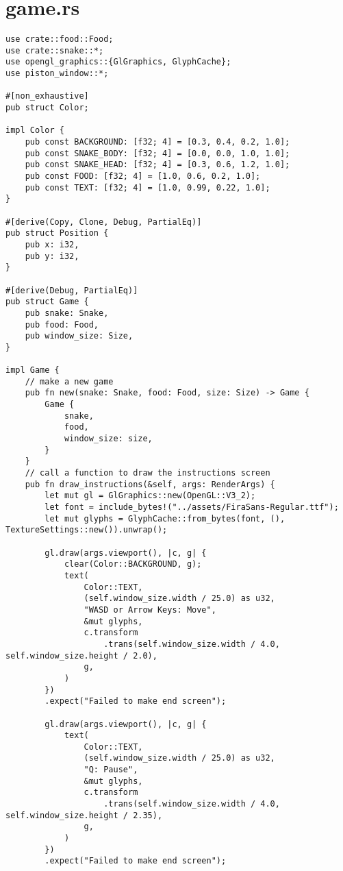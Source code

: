 \documentclass{article}
\begin{document}
\section{game.rs}
\begin{verbatim}
use crate::food::Food;
use crate::snake::*;
use opengl_graphics::{GlGraphics, GlyphCache};
use piston_window::*;

#[non_exhaustive]
pub struct Color;

impl Color {
    pub const BACKGROUND: [f32; 4] = [0.3, 0.4, 0.2, 1.0];
    pub const SNAKE_BODY: [f32; 4] = [0.0, 0.0, 1.0, 1.0];
    pub const SNAKE_HEAD: [f32; 4] = [0.3, 0.6, 1.2, 1.0];
    pub const FOOD: [f32; 4] = [1.0, 0.6, 0.2, 1.0];
    pub const TEXT: [f32; 4] = [1.0, 0.99, 0.22, 1.0];
}

#[derive(Copy, Clone, Debug, PartialEq)]
pub struct Position {
    pub x: i32,
    pub y: i32,
}

#[derive(Debug, PartialEq)]
pub struct Game {
    pub snake: Snake,
    pub food: Food,
    pub window_size: Size,
}

impl Game {
    // make a new game
    pub fn new(snake: Snake, food: Food, size: Size) -> Game {
        Game {
            snake,
            food,
            window_size: size,
        }
    }
    // call a function to draw the instructions screen
    pub fn draw_instructions(&self, args: RenderArgs) {
        let mut gl = GlGraphics::new(OpenGL::V3_2);
        let font = include_bytes!("../assets/FiraSans-Regular.ttf");
        let mut glyphs = GlyphCache::from_bytes(font, (), TextureSettings::new()).unwrap();

        gl.draw(args.viewport(), |c, g| {
            clear(Color::BACKGROUND, g);
            text(
                Color::TEXT,
                (self.window_size.width / 25.0) as u32,
                "WASD or Arrow Keys: Move",
                &mut glyphs,
                c.transform
                    .trans(self.window_size.width / 4.0, self.window_size.height / 2.0),
                g,
            )
        })
        .expect("Failed to make end screen");

        gl.draw(args.viewport(), |c, g| {
            text(
                Color::TEXT,
                (self.window_size.width / 25.0) as u32,
                "Q: Pause",
                &mut glyphs,
                c.transform
                    .trans(self.window_size.width / 4.0, self.window_size.height / 2.35),
                g,
            )
        })
        .expect("Failed to make end screen");


\end{verbatim}
\end{document}
